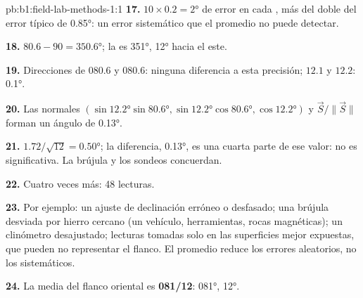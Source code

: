\begin{solution}{pb:b1:field-lab-methods-1:1}
\textbf{17.} $10\times0.2 = \ang{2}$ de error en cada , más del doble del error típico de
\ang{0.85}: un error sistemático que el promedio no puede detectar.

\textbf{18.} $80.6 - 90 = \ang{350.6}$; la  es  \ang{351},  \ang{12} hacia el este.

\textbf{19.} Direcciones de  $080.6$ y $080.6$: ninguna diferencia a esta precisión; 
$12.1$ y $12.2$: \ang{0.1}.

\textbf{20.} Las normales $(\sin\ang{12.2}\sin\ang{80.6},
\sin\ang{12.2}\cos\ang{80.6}, \cos\ang{12.2})$ y $\vec S/\|\vec S\|$ forman un ángulo de \ang{0.13}.

\textbf{21.} $1.72/\sqrt{12} = \ang{0.50}$; la diferencia, \ang{0.13}, es una cuarta parte de ese valor: no es
significativa. La brújula y los sondeos concuerdan.

\textbf{22.} Cuatro veces más: 48 lecturas.

\textbf{23.} Por ejemplo: un ajuste de declinación erróneo o desfasado; una brújula desviada por hierro
cercano (un vehículo, herramientas, rocas magnéticas); un clinómetro desajustado; lecturas tomadas solo en
las superficies mejor expuestas, que pueden no representar el flanco. El promedio reduce los errores
aleatorios, no los sistemáticos.

\textbf{24.} La  media del flanco oriental es \textbf{081/12}:  \ang{081},
 \ang{12}.
\end{solution}
